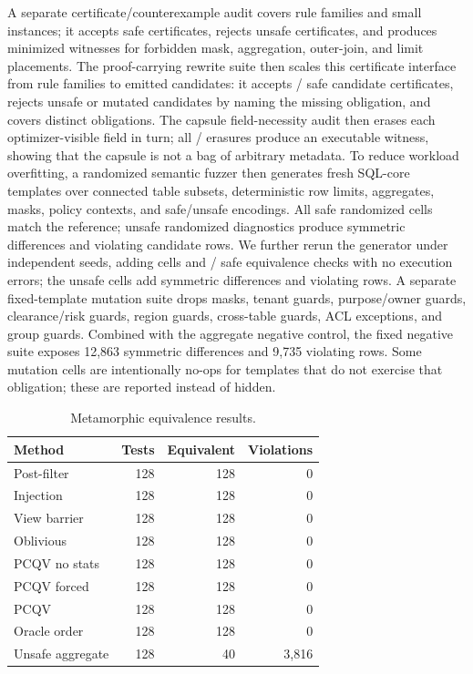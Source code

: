\documentclass[conference]{IEEEtran}
\newcommand{\pcqv}{PCQV}
\begin{document}
A separate certificate/counterexample audit covers \CertRules{} rule families and \CertCases{} small instances; it accepts \CertAccepted{} safe certificates, rejects \CertRejected{} unsafe certificates, and produces \CertUnsafeWitnesses{} minimized witnesses for forbidden mask, aggregation, outer-join, and limit placements. The proof-carrying rewrite suite then scales this certificate interface from rule families to emitted candidates: it accepts \ProofCertSafeAccepted{}/\ProofCertSafeTotal{} safe candidate certificates, rejects \ProofCertRejected{} unsafe or mutated candidates by naming the missing obligation, and covers \ProofCertObligations{} distinct obligations. The capsule field-necessity audit then erases each optimizer-visible field in turn; all \CapsuleNecessaryFields{}/\CapsuleFieldsTested{} erasures produce an executable witness, showing that the capsule is not a bag of arbitrary metadata. To reduce workload overfitting, a randomized semantic fuzzer then generates \RandomFuzzTemplates{} fresh SQL-core templates over connected table subsets, deterministic row limits, aggregates, masks, policy contexts, and safe/unsafe encodings. All \RandomFuzzSafeEq{} safe randomized cells match the reference; unsafe randomized diagnostics produce \RandomFuzzDiffs{} symmetric differences and \RandomFuzzViolations{} violating candidate rows. We further rerun the generator under \MultiSeedFuzzSeeds{} independent seeds, adding \MultiSeedFuzzRows{} cells and \MultiSeedFuzzSafeEq{}/\MultiSeedFuzzSafeTotal{} safe equivalence checks with no execution errors; the unsafe cells add \MultiSeedFuzzDiffs{} symmetric differences and \MultiSeedFuzzViolations{} violating rows. A separate fixed-template mutation suite drops masks, tenant guards, purpose/owner guards, clearance/risk guards, region guards, cross-table guards, ACL exceptions, and group guards. Combined with the aggregate negative control, the fixed negative suite exposes 12,863 symmetric differences and 9,735 violating rows. Some mutation cells are intentionally no-ops for templates that do not exercise that obligation; these are reported instead of hidden.

\begin{table}[t]
\centering
\caption{Metamorphic equivalence results.}
\label{tab:correctness}
\begin{tabular}{lrrr}
\toprule
Method & Tests & Equivalent & Violations \\
\midrule
Post-filter & 128 & 128 & 0 \\
Injection & 128 & 128 & 0 \\
View barrier & 128 & 128 & 0 \\
Oblivious & 128 & 128 & 0 \\
\pcqv{} no stats & 128 & 128 & 0 \\
\pcqv{} forced & 128 & 128 & 0 \\
\pcqv{} & 128 & 128 & 0 \\
Oracle order & 128 & 128 & 0 \\
Unsafe aggregate & 128 & 40 & 3,816 \\
\bottomrule
\end{tabular}
\end{table}
\end{document}
